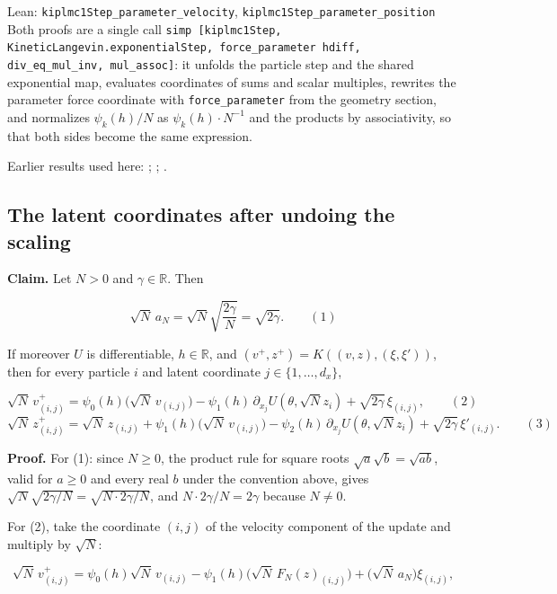 \documentclass[11pt,a4paper]{report}
\begin{document}
\begin{leanbox}{Lean: \texttt{kiplmc1Step\_\allowbreak{}parameter\_\allowbreak{}velocity}, \texttt{kiplmc1Step\_\allowbreak{}parameter\_\allowbreak{}position}}
Both proofs are a single call \texttt{simp [kiplmc1\allowbreak{}Step, Kinetic\allowbreak{}Langevin.\allowbreak{}exponential\allowbreak{}Step, force\_\allowbreak{}parameter hdiff, div\_\allowbreak{}eq\_\allowbreak{}mul\_\allowbreak{}inv, mul\_\allowbreak{}assoc]}: it unfolds the particle step and the shared exponential map, evaluates coordinates of sums and scalar multiples, rewrites the parameter force coordinate with \texttt{force\_\allowbreak{}parameter} from the geometry section, and normalizes \(\psi_k(h)/N\) as \(\psi_k(h)\cdot N^{-1}\) and the products by associativity, so that both sides become the same expression.
\end{leanbox}


Earlier results used here: \cite[Section~3.1.1]{LangevinLean2026IPLA}; \cite[Section~3.10.1]{LangevinLean2026Kinetic}; \cite[Section~3.12.2]{LangevinLean2026Kinetic}.
\subsection{\texorpdfstring{The latent coordinates after undoing the scaling}{The latent coordinates after undoing the scaling}}
\label{report-step-KIPLMC-Exponential-lean-3}


\textbf{Claim.} Let \(N>0\) and \(\gamma\in\mathbb R\). Then


\[\sqrt N\,a_N=\sqrt N\sqrt{\frac{2\gamma}N}=\sqrt{2\gamma}.\qquad(1)\]


If moreover \(U\) is differentiable, \(h\in\mathbb R\), and \((v^+,z^+)=K((v,z),(\xi,\xi'))\), then for every particle \(i\) and latent coordinate \(j\in\{1,\dots,d_x\}\),


\[\sqrt N\,v^+_{(i,j)}=\psi_0(h)\bigl(\sqrt N\,v_{(i,j)}\bigr)-\psi_1(h)\,\partial_{x_j}U(\theta,\sqrt Nz_i)+\sqrt{2\gamma}\,\xi_{(i,j)},\qquad(2)\]
\[\sqrt N\,z^+_{(i,j)}=\sqrt N\,z_{(i,j)}+\psi_1(h)\bigl(\sqrt N\,v_{(i,j)}\bigr)-\psi_2(h)\,\partial_{x_j}U(\theta,\sqrt Nz_i)+\sqrt{2\gamma}\,\xi'_{(i,j)}.\qquad(3)\]


\textbf{Proof.} For (1): since \(N\ge0\), the product rule for square roots \(\sqrt a\sqrt b=\sqrt{ab}\), valid for \(a\ge0\) and every real \(b\) under the convention above, gives \(\sqrt N\sqrt{2\gamma/N}=\sqrt{N\cdot2\gamma/N}\), and \(N\cdot2\gamma/N=2\gamma\) because \(N\ne0\).




For (2), take the coordinate \((i,j)\) of the velocity component of the update and multiply by \(\sqrt N\):


\[\sqrt N\,v^+_{(i,j)}=\psi_0(h)\sqrt N\,v_{(i,j)}-\psi_1(h)\bigl(\sqrt N\,F_N(z)_{(i,j)}\bigr)+\bigl(\sqrt N\,a_N\bigr)\xi_{(i,j)},\]
\end{document}
